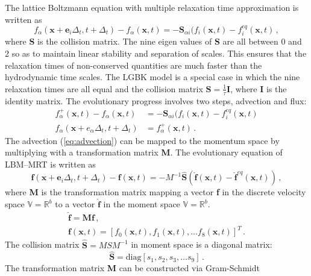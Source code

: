 The lattice Boltzmann equation with multiple relaxation time approximation is 
written as
%
\begin{equation}
f_{\alpha}(\mathbf{x}+\mathbf{e}_i\Delta_t, t+ 
\Delta_t)-f_{\alpha}(\mathbf{x},t)=-\mathbf{S}_{\alpha 
	i}(f_i(\mathbf{x},t)-f_i^{eq}(\mathbf{x},t)\,,
\end{equation}
%
\noindent where \textbf{S} is the collision matrix. The nine eigen values of 
\textbf{S} are all between 0 and 2 so as to maintain linear stability and 
separation of scales. This ensures that the relaxation times of non-conserved 
quantities are much faster than the hydrodynamic time scales. The LGBK model is 
a special case in which the nine relaxation times are all equal and the 
collision matrix $\mathbf{S}=\frac{1}{\tau}\mathbf{I}$, where \textbf{I} is the 
identity matrix. The evolutionary progress involves two steps, advection and 
flux:
%
\begin{align}
f_{\alpha}^+(\mathbf{x},t)-f_{\alpha}(\mathbf{x},t) & = -\mathbf{S}_{\alpha 
i}(f_i(\mathbf{x},t)-f_i^{eq}(\mathbf{x},t) \label{eq:advection}\\
f_{\alpha}(\mathbf{x}+e_{\alpha}\Delta_t, t+\Delta_t) & = 
f_{\alpha}^+(\mathbf{x},t)\,.
\end{align}
%
The advection (\cref{eq:advection}) can be mapped to the 
momentum space by multiplying with a transformation matrix \textbf{M}. The 
evolutionary equation of LBM--MRT is written as
%
\begin{equation}
\mathbf{f}(\mathbf{x}+\mathbf{e}_i\Delta_t, t+ 
\Delta_t)-\mathbf{f}(\mathbf{x},t)=-M^{-1}\hat{\mathbf{S}}(\hat{\mathbf{f}}
(\mathbf{x},t)-\hat{\mathbf{f}}^{eq}(\mathbf{x},t))\,,
\end{equation}
%
\noindent where \textbf{M} is the transformation matrix mapping a vector 
\textbf{f} in the discrete velocity space $\mathds{V}=\mathds{R}^b$ to a vector 
$\hat{\mathbf{f}}$ in the moment space $\mathds{V}=\mathds{R}^b$. 
%
\begin{gather}
\hat{\mathbf{f}}= \mathbf{M}\mathbf{f}\,, \\ 
\mathbf{f}(\mathbf{x},t) =\left[f_0(\mathbf{x},t),f_1(\mathbf{x},t),\dots 
f_8(\mathbf{x},t)\right]^T\,.
\end{gather}
%
The collision matrix $\hat{\mathbf{S}} = MSM^{-1}$ in moment space is 
a diagonal matrix:
\begin{equation*}
\hat{\mathbf{S}} =\mbox{diag} \left[ s_1, s_2, s_3, \dots s_9  \right]\,.
\end{equation*} 
%
The transformation matrix \textbf{M} can be constructed via Gram-Schmidt 
